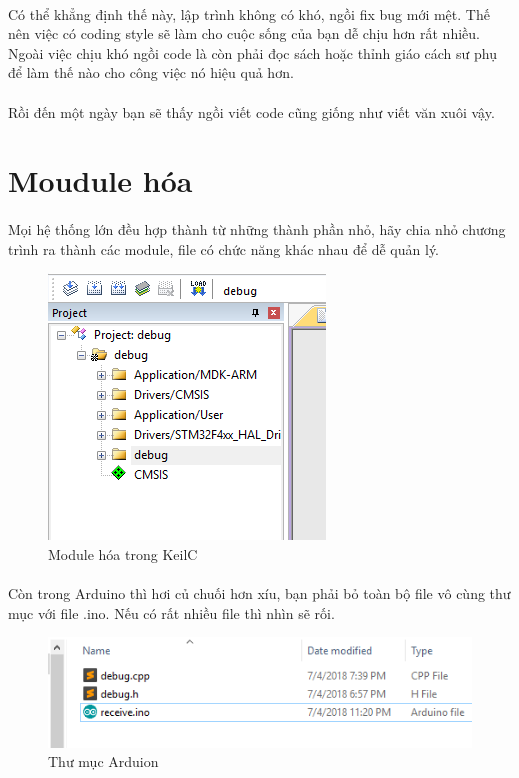 \documentclass[12pt,a5paper]{book}
\begin{document}
\paragraph{}
Có thể khẳng định thế này, lập trình không có khó, ngồi fix bug mới mệt. Thế nên việc có coding style sẽ làm cho cuộc sống của bạn dễ chịu hơn rất nhiều. Ngoài việc chịu khó ngồi code là còn phải đọc sách hoặc thỉnh giáo cách sư phụ để làm thế nào cho công việc nó hiệu quả hơn.
\paragraph{}
Rồi đến một ngày bạn sẽ thấy ngồi viết code cũng giống như viết văn xuôi vậy.
\newpage
\section{Moudule hóa}
\paragraph{}
Mọi hệ thống lớn đều hợp thành từ những thành phần nhỏ, hãy chia nhỏ chương trình ra thành các module, file có chức năng khác nhau để dễ quản lý.
\begin{figure}[h!]
\centering
 \includegraphics[width=0.6\linewidth]{module.png}
 \caption{Module hóa trong KeilC}
\end{figure}
\paragraph{}
Còn trong Arduino thì hơi củ chuối hơn xíu, bạn phải bỏ toàn bộ file vô cùng thư mục với file .ino. Nếu có rất nhiều file thì nhìn sẽ rối. 
\begin{figure}[h!]
\centering
 \includegraphics[width=1\linewidth]{arduino_folder.png}
 \caption{Thư mục Arduion}
\end{figure}
\end{document}
